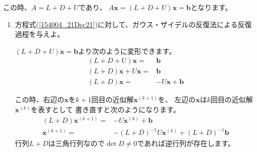 \documentclass[12pt,b5paper]{ltjsarticle}
\begin{document}
この時、$A=L+D+U$であり、
$A\bm{x}=(L+D+U)\bm{x}=\bm{b}$となります。

\hrulefill
\begin{enumerate}\renewcommand{\theenumi}{(\roman{enumi})}
 \item 方程式(\ref{154004_21Dec21})に対して、ガウス・ザイデルの反復法による反復過程を与えよ。
       \label{153528_21Dec21}

       \dotfill

       $(L+D+U)\bm{x}=\bm{b}$より次のように変形できます。
       \begin{align}
        (L+D+U)\bm{x}=&\bm{b}\\
        (L+D)\bm{x}+U\bm{x}=&\bm{b}\\
        (L+D)\bm{x}=&-U\bm{x}+\bm{b}
       \end{align}

       この時、右辺の$\bm{x}$を$k+1$回目の近似解$\bm{x}^{(k+1)}$を、
       左辺の$\bm{x}$は$k$回目の近似解$\bm{x}^{(k)}$を表すとして
       書き直すと次のようになります。
       \begin{align}
        (L+D)\bm{x}^{(k+1)}=&-U\bm{x}^{(k)}+\bm{b}\\
        \bm{x}^{(k+1)}=& -(L+D)^{-1}U\bm{x}^{(k)}+(L+D)^{-1}\bm{b}\label{213753_21Dec21}
       \end{align}
       行列$L+D$は三角行列なので$\det D\ne0$であれば逆行列が存在します。


\end{enumerate}
\end{document}
